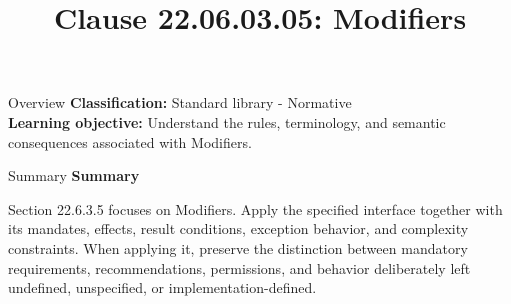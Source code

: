\documentclass[10pt,letterpaper]{article}
\title{Clause 22.06.03.05: Modifiers}
\author{}
\date{}
\begin{document}
\maketitle
\begin{CornellOverviewBox}{Overview}
\textbf{Classification:} Standard library - Normative\\[2pt]
\textbf{Learning objective:} Understand the rules, terminology, and semantic consequences associated with Modifiers.
\end{CornellOverviewBox}\begin{CornellSummaryBox}{Summary}
{\sffamily\bfseries\color{Accent} Summary}\par\vspace{3pt}Section 22.6.3.5 focuses on Modifiers. Apply the specified interface together with its mandates, effects, result conditions, exception behavior, and complexity constraints. When applying it, preserve the distinction between mandatory requirements, recommendations, permissions, and behavior deliberately left undefined, unspecified, or implementation-defined.
\end{CornellSummaryBox}
\end{document}
